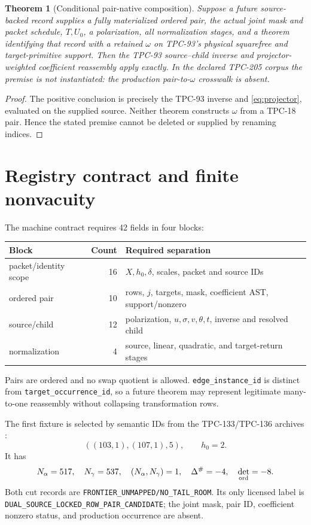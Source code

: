\documentclass[11pt]{article}
\newtheorem{theorem}{Theorem}
\newcommand{\code}[1]{\nolinkurl{#1}}
\begin{document}
\begin{theorem}[Conditional pair-native composition]
\label{thm:conditional}
Suppose a future source-backed record supplies a fully materialized ordered
pair, the actual joint mask and packet schedule, \(T,U_0\), a polarization,
all normalization stages, and a theorem identifying that record with a
retained \(\omega\) on TPC-93's physical squarefree and target-primitive
support.  Then the TPC-93 source--child inverse and projector-weighted
coefficient reassembly apply exactly.  In the declared TPC-205 corpus the
premise is not instantiated: the production pair-to-\(\omega\) crosswalk is
absent.
\end{theorem}

\begin{proof}
The positive conclusion is precisely the TPC-93 inverse and
\eqref{eq:projector}, evaluated on the supplied source.  Neither theorem
constructs \(\omega\) from a TPC-18 pair.  Hence the stated premise cannot be
deleted or supplied by renaming indices.
\end{proof}

\section{Registry contract and finite nonvacuity}

The machine contract requires 42 fields in four blocks:
\begin{center}
\small
\begin{tabularx}{0.96\linewidth}{@{}l r X@{}}
\toprule
Block & Count & Required separation\\
\midrule
packet/identity scope & 16 & \(X,h_0,\delta\), scales, packet and source IDs\\
ordered pair & 10 & rows, \(j\), targets, mask, coefficient AST, support/nonzero\\
source/child & 12 & polarization, \(u,\sigma,v,\theta,t\), inverse and resolved child\\
normalization & 4 & source, linear, quadratic, and target-return stages\\
\bottomrule
\end{tabularx}
\end{center}
Pairs are ordered and no swap quotient is allowed.
\code{edge_instance_id} is distinct from
\code{target_occurrence_id}, so a future theorem may represent legitimate
many-to-one reassembly without collapsing transformation rows.

The first fixture is selected by semantic IDs from the TPC-133/TPC-136
archives \citep{WangTPC133,WangTPC136}:
\[
 ((103,1),(107,1),5),\qquad h_0=2.
\]
It has
\[
 N_\alpha=517,\quad N_\gamma=537,\quad
 (N_\alpha,N_\gamma)=1,\quad
 \Delta^\#=-4,\quad\det_{\rm ord}=-8.
\]
Both cut records are
\code{FRONTIER_UNMAPPED/NO_TAIL_ROOM}.  Its only licensed label is
\code{DUAL_SOURCE_LOCKED_ROW_PAIR_CANDIDATE}; the joint mask, pair ID,
coefficient nonzero status, and production occurrence are absent.
\end{document}
